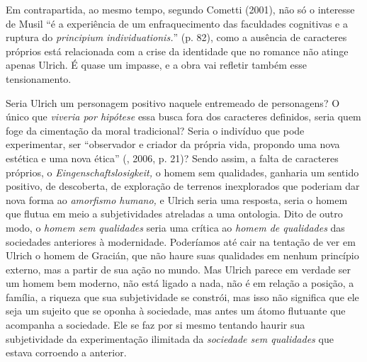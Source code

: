 Em contrapartida, ao mesmo tempo, segundo Cometti (2001), não só o
interesse de Musil ``é a experiência de um enfraquecimento das
faculdades cognitivas e a ruptura do \emph{principium}
\emph{individuationis.}'' (p. 82), como a ausência de caracteres
próprios está relacionada com a crise da identidade que no romance não
atinge apenas Ulrich. É quase um impasse, e a obra vai refletir também
esse tensionamento.

Seria Ulrich um personagem positivo naquele entremeado de personagens? O
único que \emph{viveria por hipótese} essa busca fora dos caracteres
definidos, seria quem foge da cimentação da moral tradicional? Seria o
indivíduo que pode experimentar, ser ``observador e criador da própria
vida, propondo uma nova estética e uma nova ética'' (, 2006, p.
21)? Sendo assim, a falta de caracteres próprios, o
\emph{Eingenschaftslosigkeit,} o homem sem qualidades, ganharia um
sentido positivo, de descoberta, de exploração de terrenos inexplorados
que poderiam dar nova forma ao \emph{amorfismo humano,} e Ulrich seria
uma resposta, seria o homem que flutua em meio a subjetividades
atreladas a uma ontologia. Dito de outro modo, o \emph{homem sem
qualidades} seria uma crítica ao \emph{homem de qualidades} das
sociedades anteriores à modernidade. Poderíamos até cair na tentação de
ver em Ulrich o homem de Gracián, que não haure suas qualidades em
nenhum princípio externo, mas a partir de sua ação no mundo. Mas Ulrich
parece em verdade ser um homem bem moderno, não está ligado a nada, não
é em relação a posição, a família, a riqueza que sua subjetividade se
constrói, mas isso não significa que ele seja um sujeito que se oponha à
sociedade, mas antes um átomo flutuante que acompanha a sociedade. Ele
se faz por si mesmo tentando haurir sua subjetividade da experimentação
ilimitada da \emph{sociedade sem qualidades} que estava corroendo a
anterior.


